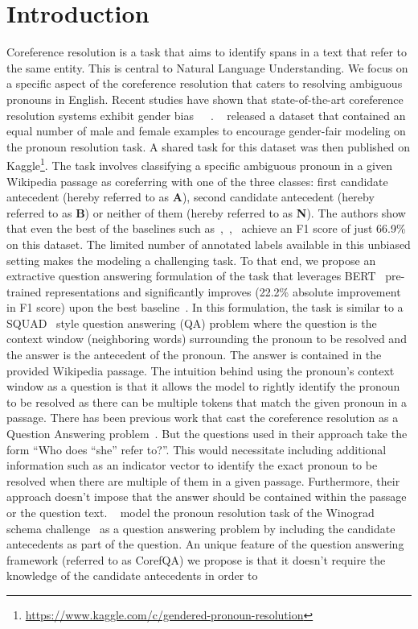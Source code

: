 \documentclass[11pt,a4paper]{article}
\begin{document}
\section{Introduction}
Coreference resolution is a task that aims to identify spans in a text that refer to the same entity. This is central to Natural Language Understanding. We focus on a specific aspect of the coreference resolution that caters to resolving ambiguous pronouns in English. Recent studies have shown that state-of-the-art coreference resolution systems exhibit gender bias~\cite{webster2018gap}~\cite{rudinger-EtAl:2018:N18}~\cite{zhao-etal-2018-gender}. ~\cite{webster2018gap} released a dataset that contained an equal number of male and female examples to encourage gender-fair modeling on the pronoun resolution task. A shared task for this dataset was then published on Kaggle\footnote{\url{https://www.kaggle.com/c/gendered-pronoun-resolution}}. The task involves classifying a specific ambiguous pronoun in a given Wikipedia passage as coreferring with one of the  three classes: first candidate antecedent (hereby referred to as \textbf{A}), second candidate antecedent (hereby referred to as \textbf{B}) or neither of them (hereby referred to as \textbf{N}). The authors show that even the best of the baselines such as~\cite{clark-manning-2015-entity},~\cite{wiseman-etal-2016-learning},~\cite{lee-etal-2017-end} achieve an F1 score of just 66.9\% on this dataset. The limited number of annotated labels available in this unbiased setting makes the modeling a challenging task. To that end, we propose an extractive question answering formulation of the task that leverages BERT~\cite{devlin2018bert} pre-trained representations and significantly improves (22.2\% absolute improvement in F1 score) upon the best baseline~\cite{webster2018gap}. In this formulation, the task is similar to a SQUAD~\cite{DBLP:conf/emnlp/RajpurkarZLL16} style question answering (QA) problem where the question is the context window (neighboring words) surrounding the pronoun to be resolved and the answer is the antecedent of the pronoun. The answer is contained in the provided Wikipedia passage. The intuition behind using the pronoun's context window as a question is that it allows the model to rightly identify the pronoun to be resolved as there can be multiple tokens that match the given pronoun in a passage. There has been previous work that cast the coreference resolution as a Question Answering problem~\cite{pmlr-v48-kumar16}. But the questions used in their approach take the form ``Who does ``she'' refer to?''. This would necessitate including additional information such as an indicator vector to identify the exact pronoun to be resolved when there are multiple of them in a given passage. Furthermore, their approach doesn't impose that the answer should be contained within the passage or the question text. ~\cite{mccann2018natural} model the pronoun resolution task of the Winograd schema challenge~\cite{levesque2012winograd} as a question answering problem by including the candidate antecedents as part of the question. An unique feature of the question answering framework (referred to as CorefQA) we propose is that it doesn't require the knowledge of the candidate antecedents in order to 
\end{document}
